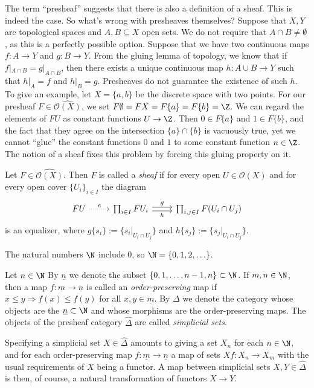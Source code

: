 The term ``presheaf'' suggests that there is also a definition of a sheaf. This is indeed the case. So what's wrong with presheaves themselves? Suppose that $X,Y$ are topological spaces and $A,B \subseteq X$ open sets. We do not require that $A \cap B \neq \emptyset$, as this is a perfectly possible option. Suppose that we have two continuous maps $f : A \to Y$ and $g : B \to Y$. From the gluing lemma of topology, we know that if $f|_{A \cap B} = g|_{A \cap B}$, then there exists a unique continuous map $h : A \cup B \to Y$ such that $h|_{A} = f$ and $h|_{B} = g$.
Presheaves do not guarantee the existence of such $h$. To give an example, let $X = \{a,b\}$ be the discrete space with two points. For our presheaf $F \in \widehat{\mathcal{O}(X)}$, we set $F\emptyset = FX = F\{a\} = F\{b\} = \Z$. We can regard the elements of $FU$ as constant functions $U \to \Z$. Then $0 \in F\{a\}$ and $1 \in F\{b\}$, and the fact that they agree on the intersection $\{a\} \cap \{b\}$ is vacuously true, yet we cannot ``glue'' the constant functions $0$ and $1$ to some constant function $n \in \Z$.
The notion of a sheaf fixes this problem by forcing this gluing property on it.
\begin{definition}
Let $F \in \widehat{\mathcal{O}(X)}$. Then $F$ is called a \emph{sheaf} if for every open $U \in \mathcal{O}(X)$ and for every open cover $\{U_i\}_{i \in I}$ the diagram
\[
	\begin{tikzcd}
		FU \arrow[r, dotted, "e"] & \prod_{i \in I} FU_i \arrow[r, shift left=.50ex, "g"] \arrow[r, shift right=.50ex, swap, "h"] & \prod_{i,j \in I} F(U_i \cap U_j)
	\end{tikzcd}
\]
is an equalizer, where $g\{s_i\} := \{s_i|_{U_i \cap U_j}\}$ and $h\{s_j\} := \{s_j|_{U_i \cap U_j}\}$.
\end{definition}
The natural numbers $\N$ include $0$, so $\N = \{0,1,2,\ldots\}$.
\begin{definition}
Let $n \in \N$ By $\underline{n}$ we denote the subset $\{0,1,\ldots,n-1,n\} \subset \N$. If $m,n \in \N$, then a map $f : \underline{m} \to \underline{n}$ is called an \emph{order-preserving} map if $x \leq y \Rightarrow f(x) \leq f(y)$ for all $x,y \in \underline{m}$. By $\Delta$ we denote the category whose objects are the $\underline{n} \subset \N$ and whose morphisms are the order-preserving maps. The objects of the presheaf category $\widehat{\Delta}$ are called \emph{simplicial sets}.
\end{definition}

Specifying a simplicial set $X \in \widehat{\Delta}$ amounts to giving a set $X_n$ for each $n \in \N$, and for each order-preserving map $f : \underline{m} \to \underline{n}$ a map of sets $Xf : X_n \to X_m$ with the usual requirements of $X$ being a functor. A map between simplicial sets $X,Y \in \widehat{\Delta}$ is then, of course, a natural transformation of functors $X \to Y$.


